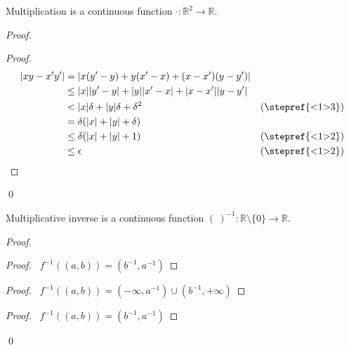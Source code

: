 \begin{lm}
  Multiplication is a continuous function $\cdot : \mathbb{R}^2 \rightarrow
  \mathbb{R}$.
\end{lm}

\begin{proof}
  \pf
  \begin{proof}
    \pf
    \begin{align*}
      |xy - x'y'| & = |x (y' - y) + y (x' - x) + (x - x') (y - y')| \\
      & \leq |x| |y'- y| + |y| |x' - x| + |x - x'| |y - y'| \\
      & < |x| \delta + |y| \delta + \delta^2 & (\text{\stepref{<1>3}}) \\
      & = \delta (|x| + |y| + \delta) \\
      & \leq \delta (|x| + |y| + 1) & (\text{\stepref{<1>2}}) \\
      & \leq \epsilon & (\text{\stepref{<1>2}})
    \end{align*}
  \end{proof}
  \qed
\end{proof}

\begin{lm}
  Multiplicative inverse is a continuous function $(\ )^{-1} : \mathbb{R}
  \setminus \{ 0 \} \rightarrow \mathbb{R}$.
\end{lm}

\begin{proof}
  \pf
  \begin{proof}
    \pf\ $f^{-1}((a, b)) = (b^{-1}, a^{-1})$
  \end{proof}
  \begin{proof}
    \pf\ $f^{-1}((a, b)) = (-\infty, a^{-1}) \cup (b^{-1}, + \infty)$
  \end{proof}
  \begin{proof}
    \pf\ $f^{-1}((a, b)) = (b^{-1}, a^{-1})$
  \end{proof}
  \qed
\end{proof}

